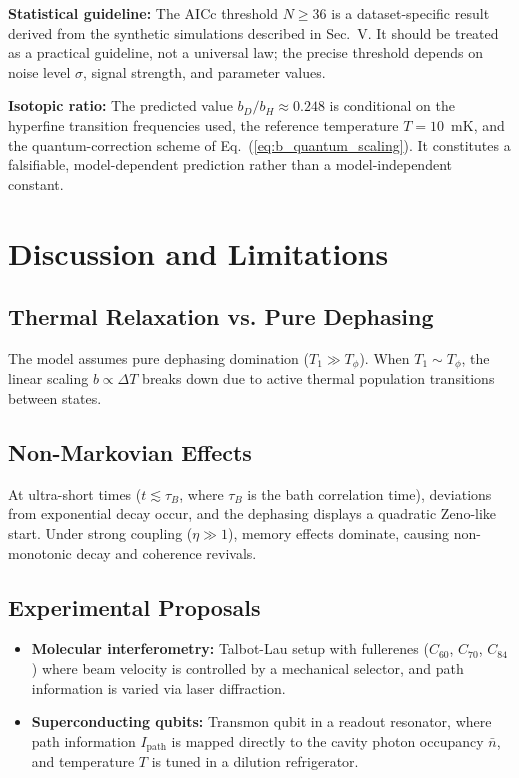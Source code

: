 \documentclass[reprint,amsmath,amssymb,aps,pra,superscriptaddress]{revtex4-2}
\begin{document}
\textbf{Statistical guideline:} The AICc threshold $N \ge 36$ is a dataset-specific
result derived from the synthetic simulations described in Sec.~V. It should be treated
as a practical guideline, not a universal law; the precise threshold depends on noise
level $\sigma$, signal strength, and parameter values.

\textbf{Isotopic ratio:} The predicted value $b_D/b_H \approx 0.248$ is conditional on
the hyperfine transition frequencies used, the reference temperature $T = 10$~mK, and
the quantum-correction scheme of Eq.~(\ref{eq:b_quantum_scaling}). It constitutes a
falsifiable, model-dependent prediction rather than a model-independent constant.

\section{Discussion and Limitations}

\subsection{Thermal Relaxation vs. Pure Dephasing}

The model assumes pure dephasing domination ($T_1 \gg T_{\phi}$). When $T_1 \sim T_{\phi}$, the linear scaling $b \propto \Delta T$ breaks down due to active thermal population transitions between states.

\subsection{Non-Markovian Effects}

At ultra-short times ($t \lesssim \tau_B$, where $\tau_B$ is the bath correlation time), deviations from exponential decay occur, and the dephasing displays a quadratic Zeno-like start. Under strong coupling ($\eta \gg 1$), memory effects dominate, causing non-monotonic decay and coherence revivals.

\subsection{Experimental Proposals}

\begin{itemize}
    \item \textbf{Molecular interferometry:} Talbot-Lau setup with fullerenes ($C_{60}$, $C_{70}$, $C_{84}$) where beam velocity is controlled by a mechanical selector, and path information is varied via laser diffraction.
    \item \textbf{Superconducting qubits:} Transmon qubit in a readout resonator, where path information $I_{\text{path}}$ is mapped directly to the cavity photon occupancy $\bar{n}$, and temperature $T$ is tuned in a dilution refrigerator.
\end{itemize}
\end{document}
